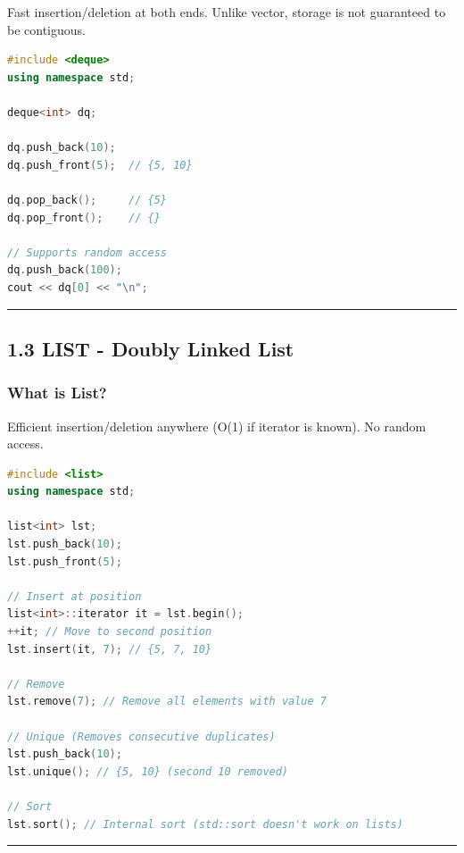 Fast insertion/deletion at both ends. Unlike vector, storage is not
guaranteed to be contiguous.

\begin{lstlisting}[language={C++}]
#include <deque>
using namespace std;

deque<int> dq;

dq.push_back(10);
dq.push_front(5);  // {5, 10}

dq.pop_back();     // {5}
dq.pop_front();    // {}

// Supports random access
dq.push_back(100);
cout << dq[0] << "\n";
\end{lstlisting}

\begin{center}\rule{0.5\linewidth}{0.5pt}\end{center}

\hypertarget{list---doubly-linked-list}{%
\subsection{1.3 LIST - Doubly Linked
List}\label{list---doubly-linked-list}}

\hypertarget{what-is-list}{%
\subsubsection{What is List?}\label{what-is-list}}

Efficient insertion/deletion anywhere (O(1) if iterator is known). No
random access.

\begin{lstlisting}[language={C++}]
#include <list>
using namespace std;

list<int> lst;
lst.push_back(10);
lst.push_front(5);

// Insert at position
list<int>::iterator it = lst.begin();
++it; // Move to second position
lst.insert(it, 7); // {5, 7, 10}

// Remove
lst.remove(7); // Remove all elements with value 7

// Unique (Removes consecutive duplicates)
lst.push_back(10);
lst.unique(); // {5, 10} (second 10 removed)

// Sort
lst.sort(); // Internal sort (std::sort doesn't work on lists)
\end{lstlisting}

\begin{center}\rule{0.5\linewidth}{0.5pt}\end{center}

